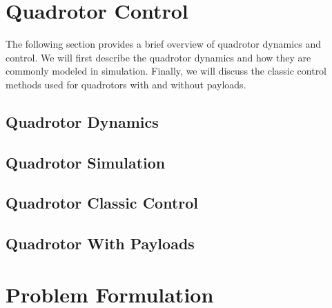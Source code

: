 \section{Quadrotor Control}
The following section provides a brief overview of quadrotor dynamics and control. We will first describe the quadrotor dynamics and how they are commonly modeled in simulation. Finally, we will discuss the classic control methods used for quadrotors with and without payloads.
\subsection{Quadrotor Dynamics}
\subsection{Quadrotor Simulation}
\subsection{Quadrotor Classic Control}
\subsection{Quadrotor With Payloads}

\section{Problem Formulation}





